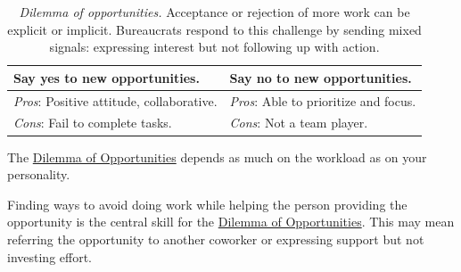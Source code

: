 \begin{center}
\begin{table}[H] %
\begin{tabular}{ | m{\dilemmatablewidth}| m{\dilemmatablewidth} | } 
  \hline
  \textbf{Say yes to new opportunities.} & 
  \textbf{Say no to new opportunities.} \\ 
  \hline
  \textit{Pros}: Positive attitude, collaborative. &
  \textit{Pros}: Able to prioritize and focus. \\
  \hline
  \textit{Cons}: Fail to complete tasks. &
  \textit{Cons}: Not a team player. \\  
  \hline
\end{tabular}
\caption{
\textit{Dilemma of opportunities.}
Acceptance or rejection of more work can be explicit or implicit. Bureaucrats respond to this challenge by sending mixed signals: expressing interest but not following up with action.
}
\label{table:dilemma-new-opportunties-yes-no}
\end{table}
\end{center}

The \hyperref[table:dilemma-new-opportunties-yes-no]{Dilemma of Opportunities} 
\iftoggle{printedonpaper}{ (\ref{table:dilemma-new-opportunties-yes-no}) }{}%
depends as much on the workload as on your personality. 

Finding ways to avoid doing work while helping the person providing the opportunity is the central skill for the \hyperref[table:dilemma-new-opportunties-yes-no]{Dilemma of Opportunities}. This may mean referring the opportunity to another coworker or expressing support but not investing effort. 



